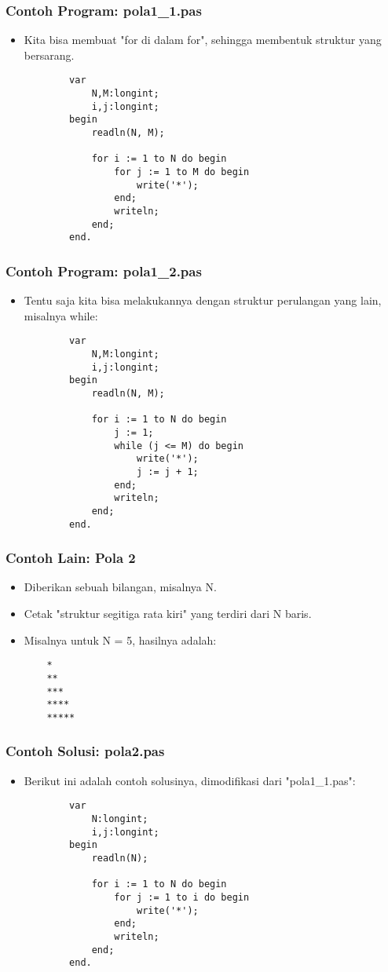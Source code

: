 \documentclass{beamer}
\begin{document}
\begin{frame}[fragile]
\frametitle{Contoh Program: pola1\_1.pas}
\begin{itemize}
	\item Kita bisa membuat "for di dalam for", sehingga membentuk struktur yang bersarang.
	\begin{lstlisting}
		var
		    N,M:longint;
		    i,j:longint;
		begin
		    readln(N, M);
		
		    for i := 1 to N do begin
		        for j := 1 to M do begin
		            write('*');
		        end;
		        writeln;
		    end;
		end.
	\end{lstlisting}
\end{itemize}
\end{frame}

\begin{frame}[fragile]
\frametitle{Contoh Program: pola1\_2.pas}
\begin{itemize}
	\item Tentu saja kita bisa melakukannya dengan struktur perulangan yang lain, misalnya while:
	\begin{lstlisting}
		var
		    N,M:longint;
		    i,j:longint;
		begin
		    readln(N, M);
		
		    for i := 1 to N do begin
		        j := 1;
		        while (j <= M) do begin
		            write('*');
		            j := j + 1;
		        end;
		        writeln;
		    end;
		end.
	\end{lstlisting}
\end{itemize}
\end{frame}

\begin{frame}[fragile]
\frametitle{Contoh Lain: Pola 2}
\begin{itemize}
	\item Diberikan sebuah bilangan, misalnya N.
	\item Cetak "struktur segitiga rata kiri" yang terdiri dari N baris.
	\item Misalnya untuk N = 5, hasilnya adalah:
	\begin{lstlisting}
	*
	**
	***
	****
	*****
	\end{lstlisting} 
\end{itemize}
\end{frame}

\begin{frame}[fragile]
\frametitle{Contoh Solusi: pola2.pas}
\begin{itemize}
	\item Berikut ini adalah contoh solusinya, dimodifikasi dari "pola1\_1.pas":
	\begin{lstlisting}
		var
		    N:longint;
		    i,j:longint;
		begin
		    readln(N);
		
		    for i := 1 to N do begin
		        for j := 1 to i do begin
		            write('*');
		        end;
		        writeln;
		    end;
		end.
	\end{lstlisting}
\end{itemize}
\end{frame}
\end{document}
